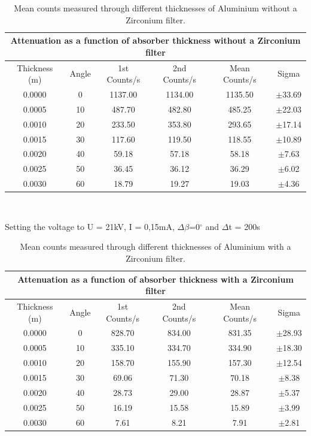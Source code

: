 \documentclass[12pt]{article}
\begin{document}
\begin{table}[H]
\begin{center}
 \footnotesize
 \begin{tabular}{|c||c||c|c||c|c|}
 \hline
 \multicolumn{6}{|c|}{Attenuation as a function of absorber thickness without a Zirconium filter} \\
 \hline
 Thickness (m) & Angle & 1st Counts/s & 2nd Counts/s & Mean Counts/s & Sigma\\
 \hline \hline
  0.0000 & 0 & 1137.00 & 1134.00 & 1135.50 & $\pm$33.69 \\
 \hline
  0.0005 & 10 & 487.70 & 482.80 & 485.25 & $\pm$22.03 \\
 \hline 
  0.0010 & 20 & 233.50 & 353.80 & 293.65 & $\pm$17.14 \\
 \hline
  0.0015 & 30 & 117.60 & 119.50 & 118.55 & $\pm$10.89 \\
 \hline 
  0.0020 & 40 & 59.18 & 57.18 & 58.18 & $\pm$7.63 \\
 \hline
  0.0025 & 50 & 36.45 & 36.12 & 36.29 & $\pm$6.02 \\
 \hline 
  0.0030 & 60 & 18.79 & 19.27 & 19.03 & $\pm$4.36 \\
 \hline 
 \end{tabular} \\ 
 \caption{Mean counts measured through different thicknesses of Aluminium without a Zirconium filter.}
 \label{Thickness No Filter}
\end{center}
\end{table}

Setting the voltage to U = 21kV, I = 0,15mA, $\Delta \beta$=0$^{\circ}$ and $\Delta$t = 200s \cite{Exp.D-2020}

\begin{table}[H]
\begin{center}
 \footnotesize
 \begin{tabular}{|c||c||c|c||c|c|}
 \hline
 \multicolumn{6}{|c|}{Attenuation as a function of absorber thickness with a Zirconium filter} \\
 \hline 
 Thickness (m) & Angle & 1st Counts/s & 2nd Counts/s & Mean Counts/s & Sigma\\
 \hline \hline
  0.0000 & 0 & 828.70 & 834.00 & 831.35 & $\pm$28.93 \\
  \hline
  0.0005 & 10 & 335.10 & 334.70 & 334.90 & $\pm$18.30 \\
 \hline 
  0.0010 & 20 & 158.70 & 155.90 & 157.30 & $\pm$12.54 \\
 \hline
  0.0015 & 30 & 69.06 & 71.30 & 70.18 & $\pm$8.38 \\
 \hline 
  0.0020 & 40 & 28.73 & 29.00 & 28.87 & $\pm$5.37 \\
 \hline
  0.0025 & 50 & 16.19 & 15.58 & 15.89 & $\pm$3.99 \\
 \hline 
  0.0030 & 60 & 7.61 & 8.21 & 7.91 & $\pm$2.81 \\
 \hline
 \end{tabular} \\ 
 \caption{Mean counts measured through different thicknesses of Aluminium with a Zirconium filter.}
 \label{Thickness Filter}
\end{center}
\end{table}
\end{document}
